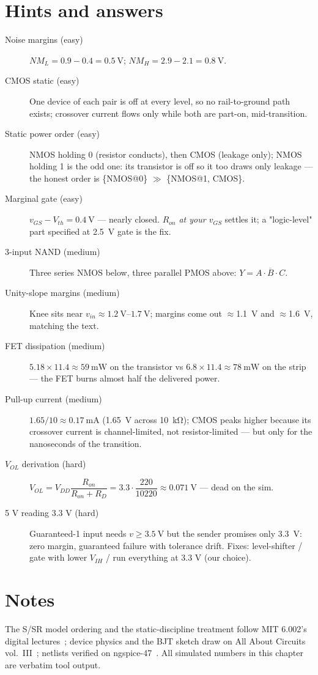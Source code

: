 \section*{Hints and answers}
\begin{description}
\item[Noise margins (easy)] $NM_L=0.9-0.4=\qty{0.5}{\volt}$;
$NM_H=2.9-2.1=\qty{0.8}{\volt}$.
\item[CMOS static (easy)] One device of each pair is off at every level,
so no rail-to-ground path exists; crossover current flows only while both
are part-on, mid-transition.
\item[Static power order (easy)] NMOS holding 0 (resistor conducts),
then CMOS (leakage only); NMOS holding 1 is the odd one: its transistor is
off so it too draws only leakage — the honest order is \{NMOS@0\}
$\gg$ \{NMOS@1, CMOS\}.
\item[Marginal gate (easy)] $v_{GS}-V_{th}=\qty{0.4}{\volt}$ — nearly
closed. $R_{on}$ \emph{at your $v_{GS}$} settles it; a "logic-level" part
specified at \qty{2.5}{\volt} gate is the fix.
\item[3-input NAND (medium)] Three series NMOS below, three parallel PMOS
above: $Y=\overline{A\cdot B\cdot C}$.
\item[Unity-slope margins (medium)] Knee sits near
$v_{in}\approx\qty{1.2}{\volt}$–$\qty{1.7}{\volt}$; margins come out
$\approx$\qty{1.1}{\volt} and $\approx$\qty{1.6}{\volt}, matching the text.
\item[FET dissipation (medium)]
$5.18\times11.4\approx\qty{59}{\milli\watt}$ on the transistor vs
$6.8\times11.4\approx\qty{78}{\milli\watt}$ on the strip
— the FET burns almost half the delivered power.
\item[Pull-up current (medium)] $1.65/10\approx\qty{0.17}{\milli\ampere}$
(\qty{1.65}{\volt} across \qty{10}{\kilo\ohm}); CMOS peaks higher because
its crossover current is channel-limited, not resistor-limited — but only
for the nanoseconds of the transition.
\item[$V_{OL}$ derivation (hard)]
$V_{OL}=V_{DD}\dfrac{R_{on}}{R_{on}+R_D}
=3.3\cdot\dfrac{220}{10220}\approx\qty{0.071}{\volt}$ — dead on the sim.
\item[5 V reading 3.3 V (hard)] Guaranteed-1 input needs
$v\ge\qty{3.5}{\volt}$ but the sender promises only \qty{3.3}{\volt}: zero
margin, guaranteed failure with tolerance drift. Fixes: level-shifter /
gate with lower $V_{IH}$ / run everything at 3.3 V (our choice).
\end{description}

\section*{Notes}
The S/SR model ordering and the static-discipline treatment follow MIT
6.002's digital lectures~\cite{ocw6002}; device physics and the BJT sketch
draw on All About Circuits vol.~III~\cite{aacvol3}; netlists verified on
ngspice-47~\cite{ngspice}. All simulated numbers in this chapter are
verbatim tool output.
